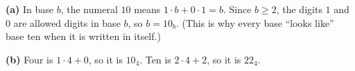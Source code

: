 \textbf{(a)} In base $b$, the numeral $10$ means $1\cdot b+0\cdot1=b$. Since $b\ge2$, the digits $1$ and $0$ are allowed digits in base $b$, so $b=10_b$. (This is why every base ``looks like'' base ten when it is written in itself.)

\textbf{(b)} Four is $1\cdot4+0$, so it is $\boxed{10_4}$. Ten is $2\cdot4+2$, so it is $\boxed{22_4}$.

